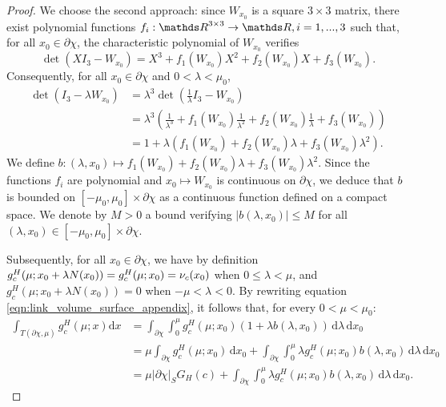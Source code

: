 \begin{proof}
We choose the second approach: since $W_{x_0}$ is a square $3\times 3$ matrix, there exist polynomial functions $f_i:\IR^{3\times 3} \rightarrow \IR, i=1,...,3$ such that, for all $x_0\in\partial\chi$, the characteristic polynomial of $W_{x_0}$ verifies 
%
$$\det(XI_3 - W_{x_0}) = X^3 + f_1(W_{x_0}) X^2 + f_2(W_{x_0}) X + f_3(W_{x_0}).$$
%
Consequently, for all $x_0\in\partial\chi$ and $0<\lambda<\mu_0$,
%
\begin{equation*}
    \begin{split}
        \det(I_3 - \lambda W_{x_0}) & = \lambda^3 \det(\frac{1}{\lambda}I_3 - W_{x_0})\\ 
        & = \lambda^3 \left(\frac{1}{\lambda^3} + f_1(W_{x_0}) \frac{1}{\lambda^2} + f_2(W_{x_0}) \frac{1}{\lambda} + f_3(W_{x_0}) \right)\\
        & = 1 + \lambda \left(f_1(W_{x_0}) + f_2(W_{x_0}) \lambda + f_3(W_{x_0}) \lambda^2\right).
    \end{split}
\end{equation*}
%
We define $b:(\lambda, x_0) \mapsto f_1(W_{x_0}) + f_2(W_{x_0}) \lambda + f_3(W_{x_0}) \lambda^2$. Since the functions $f_i$ are polynomial and $x_0\mapsto W_{x_0}$ is continuous on $\partial\chi$, we deduce that $b$ is bounded on $[-\mu_0, \mu_0] \times \partial \chi$ as a continuous function defined on a compact space. We denote by $M>0$ a bound verifying $|b(\lambda, x_0)| \leq M$ for all $(\lambda, x_0) \in [-\mu_0, \mu_0] \times \partial \chi$.

Subsequently, for all $x_0\in \partial\chi$, we have by definition $g_c^H(\mu;x_0 + \lambda N(x_0)) = g_c^H(\mu;x_0) = \nu_c(x_0)$ when $0 \leq \lambda < \mu$, and $g_c^H(\mu;x_0 + \lambda N(x_0))= 0$ when $-\mu < \lambda < 0$. By rewriting equation \ref{eqn:link_volume_surface_appendix}, it follows that, for every $0<\mu<\mu_0$:
%
\begin{equation}
\begin{split}
    \int_{T(\partial\chi, \mu)}  g_c^H(\mu;x) \text{d}x & = \int_{\partial\chi} \int_{0}^\mu g_c^H(\mu;x_0)(1 + \lambda b(\lambda, x_0)) \,\text{d}\lambda \,\text{d}x_0\\
    & = \mu \int_{\partial\chi} g_c^H(\mu;x_0) \,\text{d}x_0 + \int_{\partial\chi} \int_{0}^\mu \lambda g_c^H(\mu;x_0) b(\lambda, x_0)\,\text{d}\lambda \,\text{d}x_0\\
    & = \mu |\partial\chi|_S G_H(c) + \int_{\partial\chi} \int_{0}^\mu \lambda g_c^H(\mu;x_0) b(\lambda, x_0)\,\text{d}\lambda \,\text{d}x_0.
\end{split}
\end{equation}
%


\end{proof}
